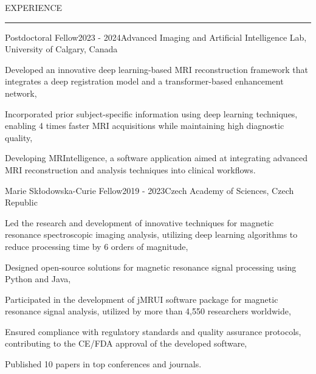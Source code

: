 \documentclass{resume} %
\renewenvironment{rSection}[1]{
\sectionskip
\textcolor{RoyalPurple}{\MakeUppercase{#1}}
\sectionlineskip
\hrule
\begin{list}{}{
\setlength{\leftmargin}{1.5em}
}
\item[]
}{
\end{list}
}
\begin{document}
\begin{rSection}{EXPERIENCE}
\begin{rSubsection}{Postdoctoral Fellow}{2023 - 2024}{Advanced Imaging and Artificial Intelligence Lab, University of Calgary, Canada}{}
\item Developed an innovative deep learning-based MRI reconstruction framework that integrates a deep registration model and a transformer-based enhancement network,
\item Incorporated prior subject-specific information using deep learning techniques, enabling 4 times faster MRI acquisitions while maintaining high diagnostic quality,
\item Developing MRIntelligence, a software application aimed at integrating advanced MRI reconstruction and analysis techniques into clinical workflows.
\end{rSubsection}
\begin{rSubsection}{Marie Skłodowska-Curie Fellow}{2019 - 2023}{Czech Academy of Sciences, Czech Republic}{}
\item Led the research and development of innovative techniques for magnetic resonance spectroscopic imaging analysis, utilizing deep learning algorithms to reduce processing time by 6 orders of magnitude,
\item Designed open-source solutions for magnetic resonance signal processing using Python and Java,
\item Participated in the development of jMRUI software package for magnetic resonance signal analysis, utilized by more than 4,550 researchers worldwide,
\clearpage
\item Ensured compliance with regulatory standards and quality assurance protocols, contributing to the CE/FDA approval of the developed software,
\item Published 10 papers in top conferences and journals.
\end{rSubsection}




\end{rSection}
\end{document}
